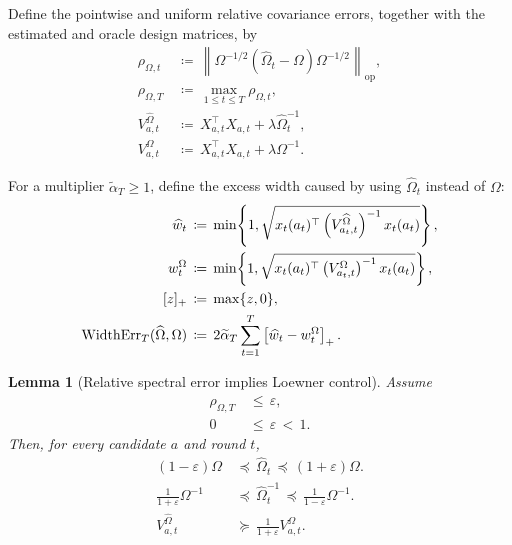 \documentclass{article} %
\newtheorem{lemma}[theorem]{Lemma}
\begin{document}
Define the pointwise and uniform relative covariance errors, together with the
estimated and oracle design matrices, by
\begin{align}
\rho_{\Omega,t}
&\,\coloneqq\,
\left\|
\Omega^{-1/2}
\left(
\widehat{\Omega}_t-\Omega
\right)
\Omega^{-1/2}
\right\|_{\mathrm{op}},
\label{eq:hyper-est-rho-t}
\\
\label{eq:hyper-est-rho-T}
\rho_{\Omega,T}
&\,\coloneqq\,
\max_{1\le t\le T}\rho_{\Omega,t},
\\
\label{eq:hyper-est-Vhat}
V_{a,t}^{\widehat{\Omega}}
&\,\coloneqq\,
X_{a,t}^{\top}X_{a,t}
+\lambda \widehat{\Omega}_t^{-1},
\\
\label{eq:hyper-est-Vomega}
V_{a,t}^{\Omega}
&\,\coloneqq\,
X_{a,t}^{\top}X_{a,t}
+\lambda \Omega^{-1}.
\end{align}

For a multiplier \(\widetilde\alpha_T\ge1\), define the excess width caused by
using \(\widehat\Omega_t\) instead of \(\Omega\):
\begin{align}
\widehat w_t
&\,\coloneqq\,
\min\!\left\{
1,
\sqrt{
x_t(a_t)^\top
\left(V_{a_t,t}^{\widehat\Omega}\right)^{-1}
x_t(a_t)}
\right\},
\notag
\\
w_t^\Omega
&\,\coloneqq\,
\min\!\left\{
1,
\sqrt{
x_t(a_t)^\top
\left(V_{a_t,t}^{\Omega}\right)^{-1}
x_t(a_t)}
\right\},
\notag
\\
[z]_{+}
&\,\coloneqq\,
\max\{z,0\},
\label{eq:hyper-est-positive-part}
\\
\operatorname{WidthErr}_T(\widehat{\Omega},\Omega)
&\,\coloneqq\,
2\widetilde\alpha_T
\sum_{t=1}^{T}
\left[\widehat w_t-w_t^\Omega\right]_{+}.
\label{eq:hyper-est-err-def}
\end{align}

\begin{lemma}[Relative spectral error implies Loewner control]
\label{lem:hyper-perturb-loewner}
Assume
\begin{align}
\rho_{\Omega,T}
&\,\leq\,
\varepsilon,
\label{eq:hyper-perturb-eps}
\\
0
&\,\leq\,
\varepsilon
\,<\,
1.
\label{eq:hyper-perturb-eps-range}
\end{align}
Then, for every candidate \(a\) and round \(t\),
\begin{align}
(1-\varepsilon)\Omega
&\,\preceq\,
\widehat{\Omega}_t
\,\preceq\,
(1+\varepsilon)\Omega .
\label{eq:hyper-perturb-omega-loewner}
\\
\frac{1}{1+\varepsilon}\Omega^{-1}
&\,\preceq\,
\widehat{\Omega}_t^{-1}
\,\preceq\,
\frac{1}{1-\varepsilon}\Omega^{-1}.
\label{eq:hyper-perturb-inv-loewner}
\\
V_{a,t}^{\widehat{\Omega}}
&\,\succeq\,
\frac{1}{1+\varepsilon}
V_{a,t}^{\Omega}.
\label{eq:hyper-perturb-V-lower}
\end{align}
\end{lemma}
\end{document}
